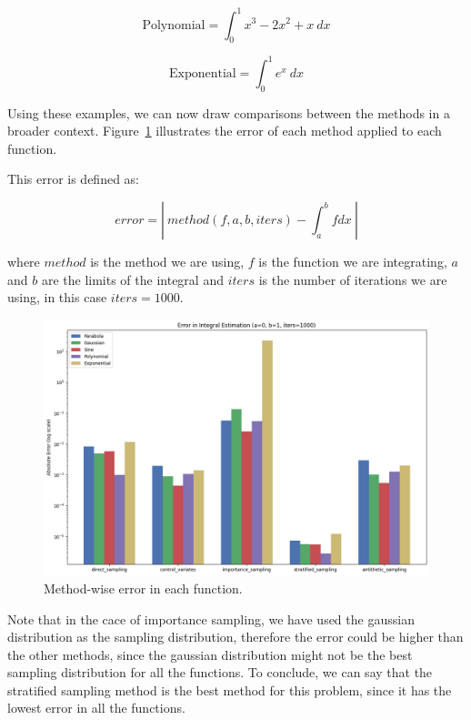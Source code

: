\documentclass{report}
\begin{document}
\begin{equation} 
	\label{eq:integralvariancereduction4} 
	\text{Polynomial} = \int_{0}^{1} x^3 - 2x^2 + x \ dx
\end{equation}

\begin{equation} 
	\label{eq:integralvariancereduction5} 
	\text{Exponential} = \int_{0}^{1} e^x \ dx
\end{equation}

Using these examples, we can now draw comparisons between the methods in a broader context. Figure~\ref{fig:comparisonvariancereduction2} illustrates the error of each method applied to each function.

This error is defined as:

\begin{equation*} error = | \ method(f, a, b, iters) - \int_a^b{f dx} \ | \end{equation*}

where \(method\) is the method we are using, \(f\) is the function we are integrating, \(a\) and \(b\) are the limits of the integral and \(iters\) is the number of iterations we are using, in this case \(iters = 1000\).

\begin{figure}[H]
\centering
\includegraphics[width=0.8\linewidth]{./Figures/VarianceReduction/comparison2.png}
\caption{Method-wise error in each function.}
\label{fig:comparisonvariancereduction2}
\end{figure}

Note that in the cace of importance sampling, we have used the gaussian distribution as the sampling distribution, therefore the error could be higher than the other methods, since the gaussian distribution might not be the best sampling distribution for all the functions. To conclude, we can say that the stratified sampling method is the best method for this problem, since it has the lowest error in all the functions. 
\end{document}
